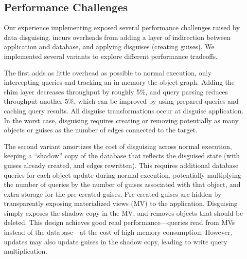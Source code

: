 
\subsection{Performance Challenges}
\label{sec:perf} Our experience implementing \sys exposed several performance challenges raised by
data disguising. \sys incurs overheads from adding a layer of indirection between
application and database, and applying disguises (\eg creating guises). We implemented
several \sys variants to explore different performance tradeoffs. 

The first adds as little overhead as possible to normal execution, only intercepting queries and
tracking an in-memory the object graph. Adding the shim layer decreases throughput by roughly 5\%,
and query parsing reduces throughput another 5\%, which can be improved by using prepared queries
and caching query results. All disguise transformations occur at disguise application. In
the worst case, disguising requires creating or removing potentially as many objects or guises as
the number of edges connected to the target.

The second variant amortizes the cost of disguising across normal execution, keeping a ``shadow''
copy of the database that reflects the disguised state (\ie with guises already created, and edges
rewritten).
%
This requires additional database queries for each object update during normal execution,
potentially multiplying the number of queries by the number of guises associated with that object,
and extra storage for the pre-created guises. 
%
Pre-created guises are hidden by transparently exposing materialized views (MV) to the application.
Disguising simply exposes the shadow copy in the MV, and removes objects that should be deleted.
%
This design achieves good read performance---queries read from MVs instead of the database---at the
cost of high memory consumption. However, updates may also update guises in the shadow copy, leading
to write query multiplication.

